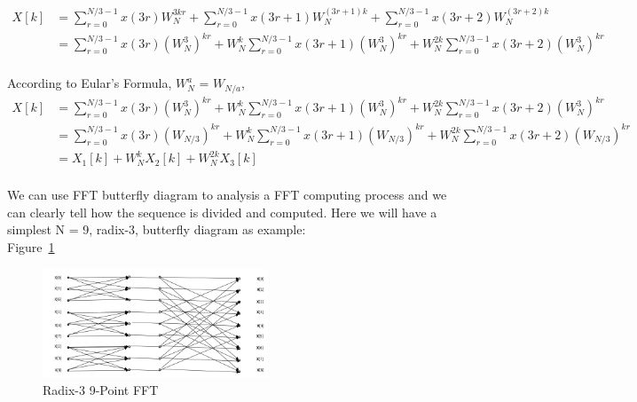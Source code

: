\documentclass[12pt]{article}
\begin{document}
\begin{align*}
X[k] &= \sum\limits_{r=0}^{N/3 -1}x(3r)W_{N}^{3kr} + \sum\limits_{r=0}^{N/3 -1}x(3r+1)W_{N}^{(3r+ 1)k} + \sum\limits_{r=0}^{N/3 -1}x(3r+2)W_{N}^{(3r+ 2)k}\\
& =  \sum\limits_{r=0}^{N/3 -1}x(3r)(W_{N}^{3})^{kr} + W_{N}^{k}\sum\limits_{r=0}^{N/3 -1}x(3r+1)(W_{N}^{3})^{kr} + W_{N}^{2k}\sum\limits_{r=0}^{N/3 -1}x(3r+2)(W_{N}^{3})^{kr}\\
\end{align*}

According to Eular's Formula, $W_{N}^{a}$ = $W_{N/a}$,\\

\begin{align*}
X[k] & =  \sum\limits_{r=0}^{N/3 -1}x(3r)(W_{N}^{3})^{kr} + W_{N}^{k}\sum\limits_{r=0}^{N/3 -1}x(3r+1)(W_{N}^{3})^{kr} + W_{N}^{2k}\sum\limits_{r=0}^{N/3 -1}x(3r+2)(W_{N}^{3})^{kr}\\
& = \sum\limits_{r=0}^{N/3 -1}x(3r)(W_{N/3})^{kr} + W_{N}^{k}\sum\limits_{r=0}^{N/3 -1}x(3r+1)(W_{N/3})^{kr} + W_{N}^{2k}\sum\limits_{r=0}^{N/3 -1}x(3r+2)(W_{N/3})^{kr}\\
& = X_1[k] + W_N^kX_2[k] + W_N^{2k}X_3[k]\\
\end{align*}

We can use FFT butterfly diagram to analysis a FFT computing process and we can clearly tell how the sequence is divided and computed. Here we will have a simplest
N = 9, radix-3, butterfly diagram as example:\\

Figure~\ref{Fig_Radix-3FFT}

\begin{figure}[h!]
\begin{center}
 \includegraphics[width=0.6\textwidth]{butterflyRedix3}
\caption{Radix-3 9-Point FFT}
\label{Fig_Radix-3FFT}
\end{center}
\end{figure}
\end{document}
